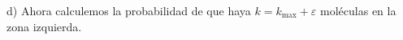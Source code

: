 d) Ahora calculemos la probabilidad de que haya $k=k_{\max }+\varepsilon$ moléculas en la zona izquierda.